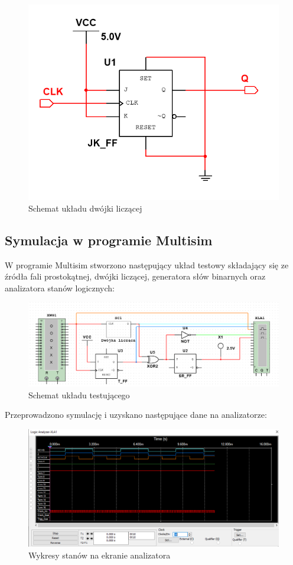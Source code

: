 \documentclass[12pt,a4paper,table]{article}
\begin{document}
    \begin{figure}[h]
        \centering
        \includegraphics[width=0.7\linewidth]{images/dwojka_schemat.PNG}
        \caption{Schemat układu dwójki liczącej}
        \label{fig:dwojka_schemat}
    \end{figure}

    \pagebreak
    \subsection{Symulacja w programie Multisim}
    W programie Multisim stworzono następujący układ testowy składający się ze źródła fali
    prostokątnej, dwójki liczącej, generatora słów binarnych oraz analizatora stanów logicznych:

    \begin{figure}[h]
        \centering
        \includegraphics[width=0.5\linewidth]{images/dwojka_test.PNG}
        \caption{Schemat układu testującego}
        \label{fig:dwojka_test}
    \end{figure}

    Przeprowadzono symulację i uzyskano następujące dane na analizatorze:

    \begin{figure}[h]
        \centering
        \includegraphics[width=\linewidth]{images/dwolka_xla.PNG}
        \caption{Wykresy stanów na ekranie analizatora}
        \label{fig:dwojka_xla}
    \end{figure}
\end{document}
